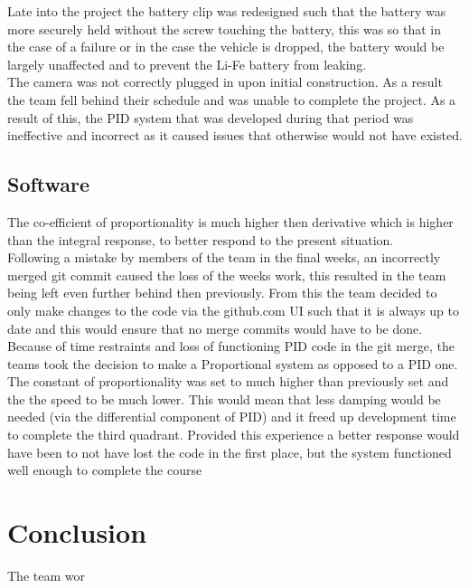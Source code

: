 \documentclass[paper=a4, fontsize=11pt]{scrartcl} %
\numberwithin{equation}{section} %
\numberwithin{figure}{section} %
\begin{document}
Late into the project the battery clip was redesigned such that the battery was
more securely held without the screw touching the battery, this was so that in
the case of a failure or in the case the vehicle is dropped, the battery would
be largely unaffected and to prevent the Li-Fe battery from leaking.\\

The camera was not correctly plugged in upon initial construction.  As a result
the team fell behind their schedule and was unable to complete the project. 
As a result of this, the PID system that was developed during that period was
ineffective and incorrect as it caused issues that otherwise would not have
existed.\\

\subsection{Software}
The co-efficient of proportionality is much higher then derivative which is
higher than the integral response, to better respond to the present situation.\\

Following a mistake by members of the team in the final weeks, an incorrectly
merged git commit caused the loss of the weeks work, this resulted in the team
being left even further behind then previously. From this the team decided to
only make changes to the code via the github.com UI such that it is always up to
date and this would ensure that no merge commits would have to be done.\\

Because of time restraints and loss of functioning PID code in the git merge,
the teams took the decision to make a Proportional system as opposed to a PID
one. The constant of proportionality was set to much higher than previously set
and the the speed to be much lower. This would mean that less damping would be
needed (via the differential component of PID) and it freed up development time
to complete the third quadrant. Provided this experience a better response would
have been to not have lost the code in the first place, but the system
functioned well enough to complete the course\\

\section{Conclusion}
The team wor
\end{document}
